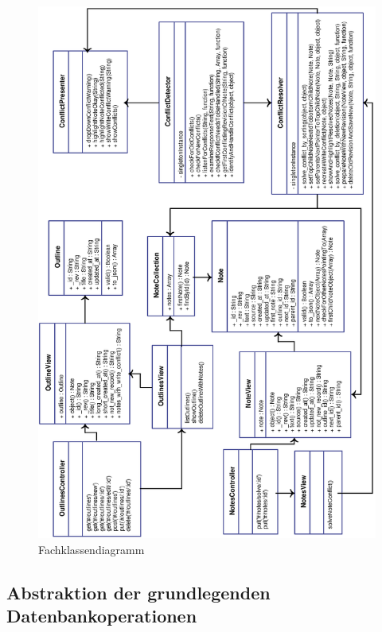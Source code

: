 \medskip
\begin{figure}[H] 
  \begin{center}
  \includegraphics[width=\textwidth]{grafik/Fachklassendiagramm} 
  \end{center}
  \caption{Fachklassendiagramm}
  \label{figure:fachklassen}
\end{figure}





\subsection{Abstraktion der grundlegenden Datenbankoperationen}

